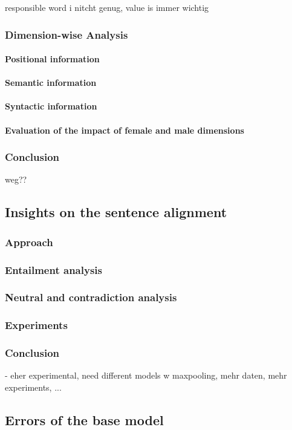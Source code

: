 responsible word i nitcht genug, value is immer wichtig
\subsubsection{Dimension-wise Analysis}\label{sec:understanding2}
\paragraph{Positional information}
\paragraph{Semantic information}
\paragraph{Syntactic information}
\paragraph{Evaluation of the impact of female and male dimensions}
\subsubsection{Conclusion}
weg??
\subsection{Insights on the sentence alignment}\label{sec:insights_sent_alignment}
\subsubsection{Approach}
\subsubsection{Entailment analysis}
\subsubsection{Neutral and contradiction analysis}
\subsubsection{Experiments}
\subsubsection{Conclusion}
- eher experimental, need different models w maxpooling, mehr daten, mehr experiments, ...
\subsection{Errors of the base model}